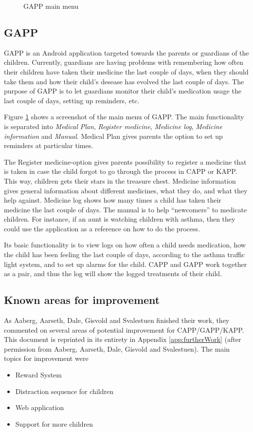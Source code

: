 \begin{figure}
\begin{minipage}[b]{0.4\linewidth}
		\caption{GAPP main menu}
		\label{fig:gapp-main-menu}
	\end{minipage}
\end{figure}


\subsection{GAPP}
GAPP is an Android application targeted towards the parents or guardians of the children. 
Currently, guardians are having problems with remembering how often their children have taken their medicine the last couple of days, when they should take them and how their child's desease has evolved the last couple of days. The purpose of GAPP is to let guardians monitor their child's medication usage the last couple of days, setting up reminders, etc.

Figure \ref{fig:gapp-main-menu} shows a screenshot of the main menu of GAPP. The main functionality is separated into 
\emph{Medical Plan}, \emph{Register medicine}, \emph{Medicine log}, \emph{Medicine information} and \emph{Manual}. 
Medical Plan gives parents the option to set up reminders at particular times. 

The Register medicine-option gives parents possibility to register a medicine that is taken in case the child forgot to go through the process in CAPP or KAPP. This way, children gets their stars in the treasure chest. 
Medicine information gives general information about different medicines, what they do, and what they help against.  
Medicine log shows how many times a child has taken their medicine the last couple of days.
The manual is to help ``newcomers'' to medicate children. For instance, if an aunt is watching children with asthma, then they could use the application as a reference on how to do the process. 
        
        
Its basic functionality is to view logs on how often a child needs medication, how the child has been feeling the last couple of days, according to the asthma traffic light system, and to set up alarms for the child. 
CAPP and GAPP work together as a pair, and thus the log will show the logged treatments of their child. 


\subsection{Known areas for improvement}
\label{sec:improvements}
As Aaberg, Aarseth, Dale, Gisvold and Svalestuen finished their work, they commented on several areas of potential improvement for CAPP/GAPP/KAPP. This document is reprinted in its entirety in Appendix \ref{app:furtherWork} (after permission from Aaberg, Aarseth, Dale, Gisvold and Svalestuen). The main topics for improvement were
\begin{itemize}
\item{Reward System}
\item{Distraction sequence for children}
\item{Web application}
\item{Support for more children}
\end{itemize}

